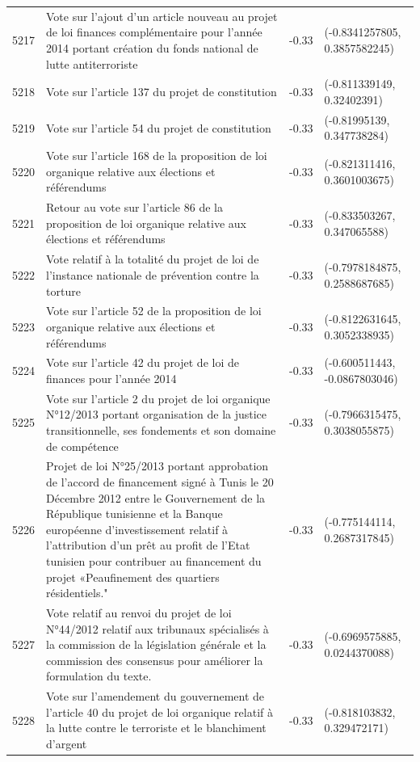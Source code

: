 \begin{table}[ht]
\begin{tabular}{rlrl}
  5217 & Vote sur l'ajout d'un article nouveau au projet de loi finances complémentaire pour l'année 2014 portant création du fonds national de lutte antiterroriste & -0.33 & (-0.8341257805, 0.3857582245) \\ 
  5218 & Vote sur l'article 137 du projet de constitution & -0.33 & (-0.811339149, 0.32402391) \\ 
  5219 & Vote sur l'article 54 du projet de constitution & -0.33 & (-0.81995139, 0.347738284) \\ 
  5220 & Vote sur l'article 168 de la proposition de loi organique relative aux élections et référendums & -0.33 & (-0.821311416, 0.3601003675) \\ 
  5221 & Retour au vote sur l'article 86 de la proposition de loi organique relative aux élections et référendums & -0.33 & (-0.833503267, 0.347065588) \\ 
  5222 & Vote relatif à la totalité du projet de loi de l'instance nationale de prévention contre la torture & -0.33 & (-0.7978184875, 0.2588687685) \\ 
  5223 & Vote sur l'article 52 de la proposition de loi organique relative aux élections et référendums & -0.33 & (-0.8122631645, 0.3052338935) \\ 
  5224 & Vote sur l'article 42 du projet de loi de finances pour l'année 2014 & -0.33 & (-0.600511443, -0.0867803046) \\ 
  5225 & Vote sur l'article 2 du projet de loi organique N°12/2013 portant organisation de la justice transitionnelle, ses fondements et son domaine de compétence & -0.33 & (-0.7966315475, 0.3038055875) \\ 
  5226 & Projet de loi N°25/2013 portant approbation de l'accord de financement signé à Tunis le 20 Décembre 2012 entre le Gouvernement de la République tunisienne et la Banque européenne d'investissement relatif à l'attribution d'un prêt au profit de l'Etat tunisien pour contribuer au financement du projet «Peaufinement des quartiers résidentiels." & -0.33 & (-0.775144114, 0.2687317845) \\ 
  5227 & Vote relatif au renvoi du projet de loi N°44/2012 relatif aux tribunaux spécialisés à la commission de la législation générale et la commission des consensus pour améliorer la formulation du texte. & -0.33 & (-0.6969575885, 0.0244370088) \\ 
  5228 & Vote sur l'amendement du gouvernement de l'article 40 du projet de loi organique relatif à la lutte contre le terroriste et le blanchiment d'argent & -0.33 & (-0.818103832, 0.329472171) \\ 

\end{tabular}
\end{table}
